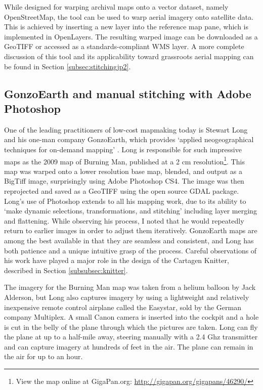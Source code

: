 \documentclass[11pt,oneside,notitlepage]{report}
\begin{document}
{{While designed for warping archival maps onto a vector dataset, namely OpenStreetMap, the tool can be used to warp aerial imagery onto satellite data. This is achieved by inserting a new layer into the reference map pane, which is implemented in OpenLayers. The resulting warped image can be downloaded as a \ac{GeoTIFF} or accessed as a standards-compliant WMS layer. A more complete discussion of this tool and its applicability toward grassroots aerial mapping can be found in Section \ref{subsec:stitchingjp2}.

\subsection{GonzoEarth and manual stitching with Adobe Photoshop}
\label{subsec:gonzoearth}

One of the leading practitioners of low-cost mapmaking today is Stewart Long and his one-man company GonzoEarth, which provides `applied neogeographical techniques for on-demand mapping' \cite{long2010process}. Long is responsible for such impressive maps as the 2009 map of Burning Man, published at a 2 cm resolution\footnote{View the map online at GigaPan.org: \url{http://gigapan.org/gigapans/46290/}}. This map was warped onto a lower resolution base map, blended, and output as a BigTiff image, surprisingly using Adobe Photoshop CS4. The image was then reprojected and saved as a \ac{GeoTIFF} using the open source \ac{GDAL} package. Long's use of Photoshop extends to all his mapping work, due to its ability to `make dynamic selections, transformations, and stitching' including layer merging and flattening. \cite{long2010process} While observing his process, I noted that he would repeatedly return to earlier images in order to adjust them iteratively. GonzoEarth maps are among the best available in that they are seamless and consistent, and Long has both patience and a unique intuitive grasp of the process. Careful observations of his work have played a major role in the design of the Cartagen Knitter, described in Section \ref{subsubsec:knitter}. 

The imagery for the Burning Man map was taken from a helium balloon by Jack Alderson, but Long also captures imagery by using a lightweight and relatively inexpensive remote control airplane called the Easystar, sold by the German company Multiplex. A small Canon camera is inserted into the cockpit and a hole is cut in the belly of the plane through which the pictures are taken. Long can fly the plane at up to a half-mile away, steering manually with a 2.4 Ghz transmitter and can capture imagery at hundreds of feet in the air. The plane can remain in the air for up to an hour.  

}}
\end{document}
